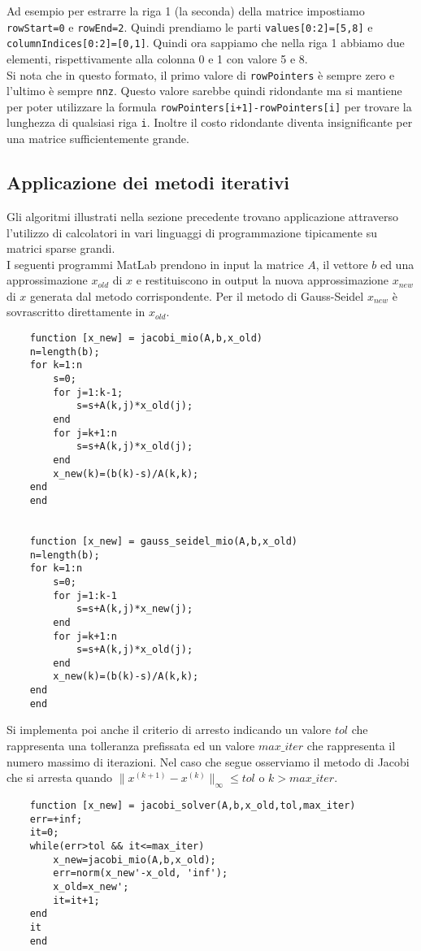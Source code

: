 \documentclass[12pt]{article}
\begin{document}
Ad esempio per estrarre la riga 1 (la seconda) della matrice impostiamo \texttt{rowStart=0} e \texttt{rowEnd=2}. Quindi prendiamo le parti \texttt{values[0:2]=[5,8]} e \texttt{columnIndices[0:2]=[0,1]}. Quindi ora sappiamo che nella riga 1 abbiamo due elementi, rispettivamente alla colonna 0 e 1 con valore 5 e 8.\\
Si nota che in questo formato, il primo valore di \texttt{rowPointers} è sempre zero e l'ultimo è sempre \texttt{nnz}. Questo valore sarebbe quindi ridondante ma si mantiene per poter utilizzare la formula \texttt{rowPointers[i+1]-rowPointers[i]} per trovare la lunghezza di qualsiasi riga \texttt{i}. Inoltre il costo ridondante diventa insignificante per una matrice sufficientemente grande.

\subsection{Applicazione dei metodi iterativi} \label{applicazione}
Gli algoritmi illustrati nella sezione precedente trovano applicazione attraverso l'utilizzo di calcolatori in vari linguaggi di programmazione tipicamente su matrici sparse grandi.\\
I seguenti programmi MatLab prendono in input la matrice \(A\), il vettore \(b\) ed una approssimazione \(x_{old}\) di \(x\) e restituiscono in output la nuova approssimazione \(x_{new}\) di \(x\) generata dal metodo corrispondente. Per il metodo di Gauss-Seidel \(x_{new}\) è sovrascritto direttamente in \(x_{old}\).
\begin{verbatim}
    function [x_new] = jacobi_mio(A,b,x_old)
    n=length(b);
    for k=1:n
        s=0;
        for j=1:k-1;
            s=s+A(k,j)*x_old(j);
        end
        for j=k+1:n
            s=s+A(k,j)*x_old(j);
        end
        x_new(k)=(b(k)-s)/A(k,k);
    end
    end
    
    
    function [x_new] = gauss_seidel_mio(A,b,x_old)
    n=length(b);
    for k=1:n
        s=0;
        for j=1:k-1
            s=s+A(k,j)*x_new(j);
        end
        for j=k+1:n
            s=s+A(k,j)*x_old(j);
        end
        x_new(k)=(b(k)-s)/A(k,k);
    end
    end
\end{verbatim}
Si implementa poi anche il criterio di arresto indicando un valore \(tol\) che rappresenta una tolleranza prefissata ed un valore \(max\_iter\) che rappresenta il numero massimo di iterazioni. Nel caso che segue osserviamo il metodo di Jacobi che si arresta quando \(\|x^{(k+1)}-x^{(k)}\|_\infty \leq tol\) o \(k > max\_iter\).
\begin{verbatim}
    function [x_new] = jacobi_solver(A,b,x_old,tol,max_iter)
    err=+inf;
    it=0;
    while(err>tol && it<=max_iter)
        x_new=jacobi_mio(A,b,x_old);
        err=norm(x_new'-x_old, 'inf');
        x_old=x_new';
        it=it+1;
    end
    it
    end
\end{verbatim}
\end{document}
